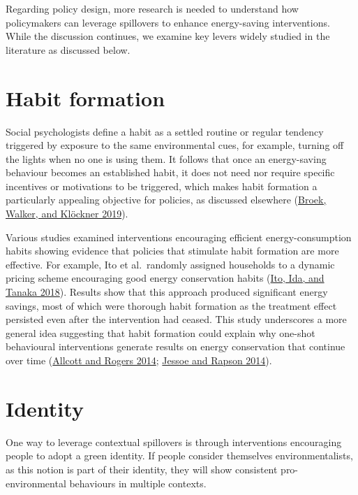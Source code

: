 \documentclass[
  11pt,
  captions=heading]{scrreport}
\begin{document}
Regarding policy design, more research is needed to understand how
policymakers can leverage spillovers to enhance energy-saving
interventions. While the discussion continues, we examine key levers
widely studied in the literature as discussed below.

\hypertarget{habit-formation}{%
\section{Habit formation}\label{habit-formation}}

Social psychologists define a habit as a settled routine or regular
tendency triggered by exposure to the same environmental cues, for
example, turning off the lights when no one is using them. It follows
that once an energy-saving behaviour becomes an established habit, it
does not need nor require specific incentives or motivations to be
triggered, which makes habit formation a particularly appealing
objective for policies, as discussed elsewhere
(\protect\hyperlink{ref-van2019drivers}{Broek, Walker, and Klöckner
2019}).

Various studies examined interventions encouraging efficient
energy-consumption habits showing evidence that policies that stimulate
habit formation are more effective. For example, Ito et al.~randomly
assigned households to a dynamic pricing scheme encouraging good energy
conservation habits (\protect\hyperlink{ref-ito2018moral}{Ito, Ida, and
Tanaka 2018}). Results show that this approach produced significant
energy savings, most of which were thorough habit formation as the
treatment effect persisted even after the intervention had ceased. This
study underscores a more general idea suggesting that habit formation
could explain why one-shot behavioural interventions generate results on
energy conservation that continue over time
(\protect\hyperlink{ref-allcott2014short}{Allcott and Rogers 2014};
\protect\hyperlink{ref-jessoe2014knowledge}{Jessoe and Rapson 2014}).

\hypertarget{identity}{%
\section{Identity}\label{identity}}

One way to leverage contextual spillovers is through interventions
encouraging people to adopt a green identity. If people consider
themselves environmentalists, as this notion is part of their identity,
they will show consistent pro-environmental behaviours in multiple
contexts.
\end{document}
